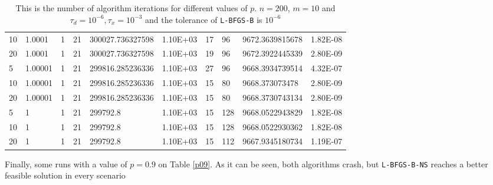 \begin{table}
\begin{center}
\begin{tabular}{|l|l|l|l|l|l|l|l|l|l|}
      10 & 1.0001 & 1 & 21 & 300027.736327598 & 1.10E+03 & 17 & 96 & 9672.3639815678 & 1.82E-08\\
      20 & 1.0001 & 1 & 21 & 300027.736327598 & 1.10E+03 & 19 & 96 & 9672.3922445339 & 2.80E-09\\
      5 & 1.00001 & 1 & 21 & 299816.285236336 & 1.10E+03 & 27 & 96 & 9668.3934739514 & 4.32E-07\\
      10 & 1.00001 & 1 & 21 & 299816.285236336 & 1.10E+03 & 15 & 80 & 9668.373073478 & 2.80E-09\\
      20 & 1.00001 & 1 & 21 & 299816.285236336 & 1.10E+03 & 15 & 80 & 9668.3730743134 & 2.80E-09\\
      5 & 1 & 1 & 21 & 299792.8 & 1.10E+03 & 15 & 128 & 9668.0522943829 & 1.82E-08\\
      10 & 1 & 1 & 21 & 299792.8 & 1.10E+03 & 15 & 128 & 9668.0522930362 & 1.82E-08\\
      20 & 1 & 1 & 21 & 299792.8 & 1.10E+03 & 15 & 112 & 9667.9345180734 & 1.19E-07\\
      \hline
    \end{tabular}
    \caption[Number of algorithm Iterations Changing $p$]{This is the number of algorithm iterations for different values of $p$. $n = 200$, $m = 10$ and $\tau_d = 10^{-6}, \tau_x = 10^{-3}$ and the tolerance of \texttt{L-BFGS-B} is $10^{-6}$ }
    \label{pmtable}
  \end{center}
\end{table}

Finally, some runs with a value of $p = 0.9$ on Table \ref{p09}. As it can be seen, both algorithms crash, but \texttt{L-BFGS-B-NS} reaches a better feasible solution in every scenario

